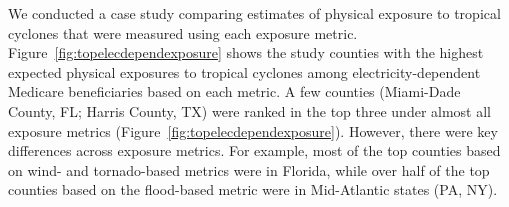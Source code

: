 We conducted a case study comparing estimates of physical exposure to
tropical cyclones that were measured using each exposure metric.
Figure~\ref{fig:topelecdependexposure} shows the study counties with the
highest expected physical exposures to tropical cyclones among
electricity-dependent Medicare beneficiaries based on each metric. A few
counties (Miami-Dade County, FL; Harris County, TX) were ranked in the top
three under almost all exposure metrics
(Figure~\ref{fig:topelecdependexposure}). However, there were key differences
across exposure metrics. For example, most of the top counties based on wind-
and tornado-based metrics were in Florida, while over half of the top counties
based on the flood-based metric were in Mid-Atlantic states (PA, NY).



